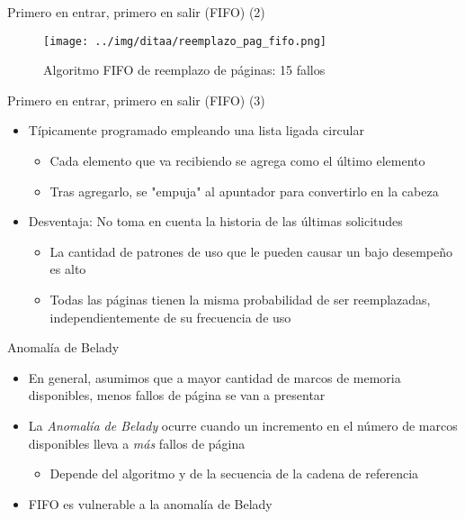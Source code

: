 \documentclass[presentation]{beamer}
\begin{document}
\begin{frame}[label={sec:orgd1d651e}]{Primero en entrar, primero en salir (FIFO) (2)}
\begin{figure}[htbp]
\centering
\texttt{[image: ../img/ditaa/reemplazo\_pag\_fifo.png]}
\caption{Algoritmo FIFO de reemplazo de páginas: 15 fallos}
\end{figure}
\end{frame}

\begin{frame}[label={sec:org4c04d04}]{Primero en entrar, primero en salir (FIFO) (3)}
\begin{itemize}
\item Típicamente programado empleando una lista ligada circular
\begin{itemize}
\item Cada elemento que va recibiendo se agrega como el último elemento
\item Tras agregarlo, se "empuja" al apuntador para convertirlo en la
cabeza
\end{itemize}
\item Desventaja: No toma en cuenta la historia de las últimas
solicitudes
\begin{itemize}
\item La cantidad de patrones de uso que le pueden causar un bajo
desempeño es alto
\item Todas las páginas tienen la misma probabilidad de ser
reemplazadas, independientemente de su frecuencia de uso
\end{itemize}
\end{itemize}
\end{frame}

\begin{frame}[label={sec:org4bb2693}]{Anomalía de Belady}
\begin{itemize}
\item En general, asumimos que a mayor cantidad de marcos de memoria
disponibles, menos fallos de página se van a presentar
\item La \emph{Anomalía de Belady} ocurre cuando un incremento en el número de
marcos disponibles lleva a \emph{más} fallos de página
\begin{itemize}
\item Depende del algoritmo y de la secuencia de la cadena de
referencia
\end{itemize}
\item FIFO es vulnerable a la anomalía de Belady
\end{itemize}
\end{frame}
\end{document}
